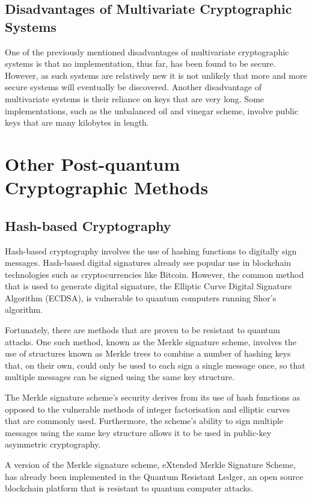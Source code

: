 \documentclass[journal]{IEEEtran}
\begin{document}
\subsection{Disadvantages of Multivariate Cryptographic Systems}

One of the previously mentioned disadvantages of multivariate cryptographic systems is that no implementation, thus far, has been found to be secure. However, as such systems are relatively new it is not unlikely that more and more secure systems will eventually be discovered. Another disadvantage of multivariate systems is their reliance on keys that are very long. Some implementations, such as the unbalanced oil and vinegar scheme, involve public keys that are many kilobytes in length.

\section{Other Post-quantum Cryptographic Methods}

\subsection{Hash-based Cryptography}

Hash-based cryptography involves the use of hashing functions to digitally sign messages. Hash-based digital signatures already see popular use in blockchain technologies such as cryptocurrencies like Bitcoin. However, the common method that is used to generate digital signature, the Elliptic Curve Digital Signature Algorithm (ECDSA), is vulnerable to quantum computers running Shor's algorithm.

Fortunately, there are methods that are proven to be resistant to quantum attacks. One such method, known as the Merkle signature scheme, involves the use of structures known as Merkle trees to combine a number of hashing keys that, on their own, could only be used to each sign a single message once, so that multiple messages can be signed using the same key structure.

The Merkle signature scheme's security derives from its use of hash functions as opposed to the vulnerable methods of  integer factorisation and elliptic curves that are commonly used. Furthermore, the scheme's ability to sign multiple messages using the same key structure allows it to be used in public-key asymmetric cryptography.

A version of the Merkle signature scheme, eXtended Merkle Signature Scheme, has already been implemented in the Quantum Resistant Ledger, an open source blockchain platform that is resistant to quantum computer attacks.
\end{document}
